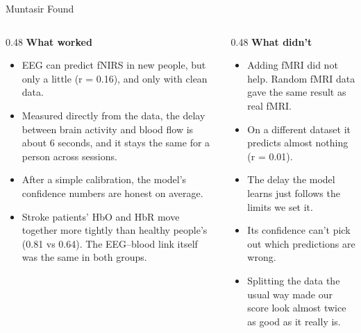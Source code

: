 \documentclass[aspectratio=169,11pt]{beamer}
\newcommand{\colhead}[1]{\textbf{#1}\par\vspace{2pt}}
\begin{document}
\begin{frame}{Muntasir Found}
\begin{slidebox}
\begin{columns}[T,onlytextwidth]
\begin{column}{0.48\textwidth}
\colhead{What worked}
\begin{itemize}\setlength{\itemsep}{4pt}
  \item EEG can predict fNIRS in new people, but only a little (r = 0.16), and only with clean data.
  \item Measured directly from the data, the delay between brain activity and blood flow is about 6 seconds, and it stays the same for a person across sessions.
  \item After a simple calibration, the model's confidence numbers are honest on average.
  \item Stroke patients' HbO and HbR move together more tightly than healthy people's (0.81 vs 0.64). The EEG--blood link itself was the same in both groups.
\end{itemize}
\end{column}
\begin{column}{0.48\textwidth}
\colhead{What didn't}
\begin{itemize}\setlength{\itemsep}{4pt}
  \item Adding fMRI did not help. Random fMRI data gave the same result as real fMRI.
  \item On a different dataset it predicts almost nothing (r = 0.01).
  \item The delay the model learns just follows the limits we set it.
  \item Its confidence can't pick out which predictions are wrong.
  \item Splitting the data the usual way made our score look almost twice as good as it really is.
\end{itemize}
\end{column}
\end{columns}
\end{slidebox}
\end{frame}
\end{document}
